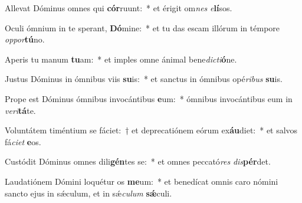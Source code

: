 \item Allevat Dóminus omnes qui \textbf{cór}ruunt:~* et érigit om\textit{nes} \textit{e}\textbf{lí}sos.
\item Oculi ómnium in te sperant, \textbf{Dó}mine:~* et tu das escam illórum in témpore \textit{op}\textit{por}\textbf{tú}no.
\item Aperis tu manum \textbf{tu}am:~* et imples omne ánimal bene\textit{dic}\textit{ti}\textbf{ó}ne.
\item Justus Dóminus in ómnibus viis \textbf{su}is:~* et sanctus in ómnibus opé\textit{ri}\textit{bus} \textbf{su}is.
\item Prope est Dóminus ómnibus invocántibus \textbf{e}um:~* ómnibus invocántibus eum in \textit{ve}\textit{ri}\textbf{tá}te.
\item Voluntátem timéntium se fáciet:~† et deprecatiónem eórum ex\textbf{áu}diet:~* et salvos fá\textit{ci}\textit{et} \textbf{e}os.
\item Custódit Dóminus omnes dili\textbf{gén}tes se:~* et omnes peccató\textit{res} \textit{dis}\textbf{pér}det.
\item Laudatiónem Dómini loquétur os \textbf{me}um:~* et benedícat omnis caro nómini sancto ejus in sǽculum, et in sǽ\textit{cu}\textit{lum} \textbf{sǽ}culi.
